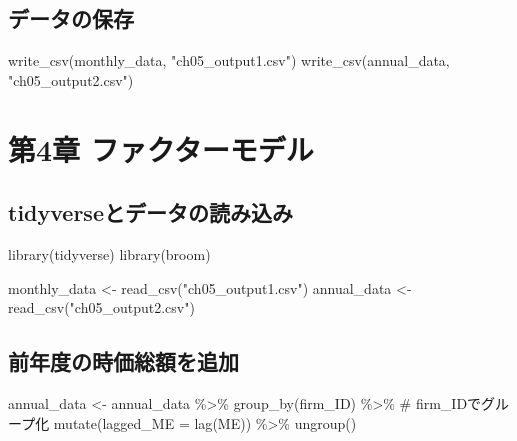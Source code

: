 \documentclass[
  letterpaper,
  DIV=11,
  numbers=noendperiod]{scrreprt}
\newenvironment{Shaded}{\begin{snugshade}}{\end{snugshade}}
\newcommand{\AttributeTok}[1]{\textcolor[rgb]{0.40,0.45,0.13}{#1}}
\newcommand{\CommentTok}[1]{\textcolor[rgb]{0.37,0.37,0.37}{#1}}
\newcommand{\FunctionTok}[1]{\textcolor[rgb]{0.28,0.35,0.67}{#1}}
\newcommand{\NormalTok}[1]{\textcolor[rgb]{0.00,0.23,0.31}{#1}}
\newcommand{\OtherTok}[1]{\textcolor[rgb]{0.00,0.23,0.31}{#1}}
\newcommand{\SpecialCharTok}[1]{\textcolor[rgb]{0.37,0.37,0.37}{#1}}
\newcommand{\StringTok}[1]{\textcolor[rgb]{0.13,0.47,0.30}{#1}}
\begin{document}
\section{データの保存}\label{ux30c7ux30fcux30bfux306eux4fddux5b58-1}

\begin{Shaded}
\begin{Highlighting}[]
\FunctionTok{write\_csv}\NormalTok{(monthly\_data, }\StringTok{"ch05\_output1.csv"}\NormalTok{)}
\FunctionTok{write\_csv}\NormalTok{(annual\_data, }\StringTok{"ch05\_output2.csv"}\NormalTok{)}
\end{Highlighting}
\end{Shaded}

\chapter{第4章
ファクターモデル}\label{ux7b2c4ux7ae0-ux30d5ux30a1ux30afux30bfux30fcux30e2ux30c7ux30eb}

\section{tidyverseとデータの読み込み}\label{tidyverseux3068ux30c7ux30fcux30bfux306eux8aadux307fux8fbcux307f}

\begin{Shaded}
\begin{Highlighting}[]
\FunctionTok{library}\NormalTok{(tidyverse)}
\FunctionTok{library}\NormalTok{(broom)}

\NormalTok{monthly\_data }\OtherTok{\textless{}{-}} \FunctionTok{read\_csv}\NormalTok{(}\StringTok{"ch05\_output1.csv"}\NormalTok{)}
\NormalTok{annual\_data  }\OtherTok{\textless{}{-}} \FunctionTok{read\_csv}\NormalTok{(}\StringTok{"ch05\_output2.csv"}\NormalTok{)}
\end{Highlighting}
\end{Shaded}

\section{前年度の時価総額を追加}\label{ux524dux5e74ux5ea6ux306eux6642ux4fa1ux7dcfux984dux3092ux8ffdux52a0}

\begin{Shaded}
\begin{Highlighting}[]
\NormalTok{annual\_data }\OtherTok{\textless{}{-}}\NormalTok{ annual\_data }\SpecialCharTok{\%\textgreater{}\%} 
  \FunctionTok{group\_by}\NormalTok{(firm\_ID) }\SpecialCharTok{\%\textgreater{}\%} \CommentTok{\# firm\_IDでグループ化}
  \FunctionTok{mutate}\NormalTok{(}\AttributeTok{lagged\_ME =} \FunctionTok{lag}\NormalTok{(ME)) }\SpecialCharTok{\%\textgreater{}\%} 
  \FunctionTok{ungroup}\NormalTok{()}
\end{Highlighting}
\end{Shaded}
\end{document}
